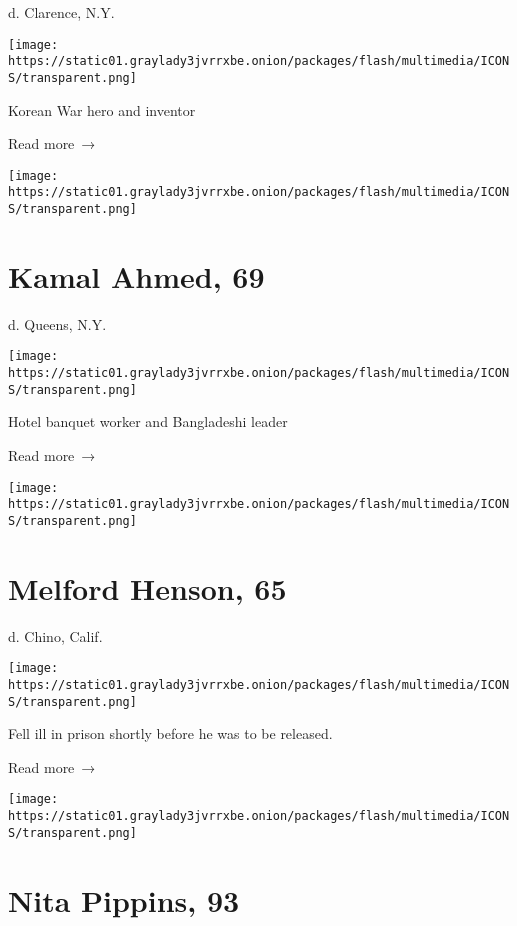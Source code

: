 d. Clarence, N.Y.

\texttt{[image: https://static01.graylady3jvrrxbe.onion/packages/flash/multimedia/ICONS/transparent.png]}

Korean War hero and inventor

 Read more~→

\href{https://www.nytimes3xbfgragh.onion/2020/05/20/nyregion/kamal-ahmed-dead-coronavirus.html}{}

\texttt{[image: https://static01.graylady3jvrrxbe.onion/packages/flash/multimedia/ICONS/transparent.png]}

\hypertarget{kamal-ahmed-69}{%
\section{Kamal Ahmed, 69}\label{kamal-ahmed-69}}

d. Queens, N.Y.

\texttt{[image: https://static01.graylady3jvrrxbe.onion/packages/flash/multimedia/ICONS/transparent.png]}

Hotel banquet worker and Bangladeshi leader

 Read more~→

\href{https://www.nytimes3xbfgragh.onion/2020/05/19/obituaries/melford-henson-dead-coronavirus.html}{}

\texttt{[image: https://static01.graylady3jvrrxbe.onion/packages/flash/multimedia/ICONS/transparent.png]}

\hypertarget{melford-henson-65}{%
\section{Melford Henson, 65}\label{melford-henson-65}}

d. Chino, Calif.

\texttt{[image: https://static01.graylady3jvrrxbe.onion/packages/flash/multimedia/ICONS/transparent.png]}

Fell ill in prison shortly before he was to be released.

 Read more~→

\href{https://www.nytimes3xbfgragh.onion/2020/05/19/obituaries/nita-pippins-dead-coronavirus.html}{}

\texttt{[image: https://static01.graylady3jvrrxbe.onion/packages/flash/multimedia/ICONS/transparent.png]}

\hypertarget{nita-pippins-93}{%
\section{Nita Pippins, 93}\label{nita-pippins-93}}

